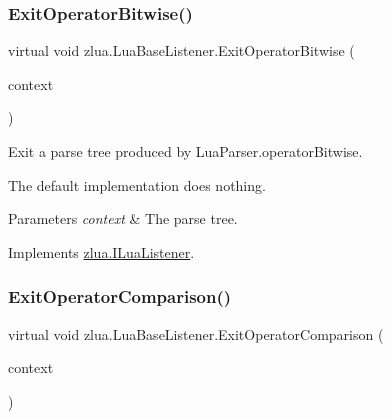 \subsubsection{\texorpdfstring{Exit\+Operator\+Bitwise()}{ExitOperatorBitwise()}}
{\footnotesize\ttfamily virtual void zlua.\+Lua\+Base\+Listener.\+Exit\+Operator\+Bitwise (\begin{DoxyParamCaption}\item[{\mbox{[}\+Not\+Null\mbox{]} \mbox{\hyperlink{classzlua_1_1_lua_parser_1_1_operator_bitwise_context}{Lua\+Parser.\+Operator\+Bitwise\+Context}}}]{context }\end{DoxyParamCaption})\hspace{0.3cm}{\ttfamily [virtual]}}



Exit a parse tree produced by Lua\+Parser.\+operator\+Bitwise. 

The default implementation does nothing.


\begin{DoxyParams}{Parameters}
{\em context} & The parse tree.\\
\hline
\end{DoxyParams}


Implements \mbox{\hyperlink{interfacezlua_1_1_i_lua_listener_ab567120e6d7258b74d7f88c14d6cf3c3}{zlua.\+I\+Lua\+Listener}}.

\mbox{\label{classzlua_1_1_lua_base_listener_a650d952f0fddbd4ddb499a7074528e60}} 
\subsubsection{\texorpdfstring{Exit\+Operator\+Comparison()}{ExitOperatorComparison()}}
{\footnotesize\ttfamily virtual void zlua.\+Lua\+Base\+Listener.\+Exit\+Operator\+Comparison (\begin{DoxyParamCaption}\item[{\mbox{[}\+Not\+Null\mbox{]} \mbox{\hyperlink{classzlua_1_1_lua_parser_1_1_operator_comparison_context}{Lua\+Parser.\+Operator\+Comparison\+Context}}}]{context }\end{DoxyParamCaption})\hspace{0.3cm}{\ttfamily [virtual]}}




